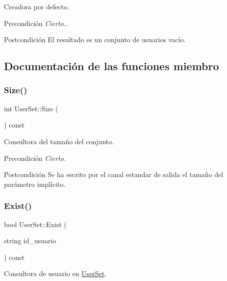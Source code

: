 Creadora por defecto. 

\begin{DoxyPrecond}{Precondición}
{\itshape Cierto.}. 
\end{DoxyPrecond}
\begin{DoxyPostcond}{Postcondición}
El resultado es un conjunto de usuarios vacío. 
\end{DoxyPostcond}


\subsection{Documentación de las funciones miembro}
\mbox{\label{class_user_set_a2474615357041661d6c00ce66209e747}} 
\subsubsection{\texorpdfstring{Size()}{Size()}}
{\footnotesize\ttfamily int User\+Set\+::\+Size (\begin{DoxyParamCaption}{ }\end{DoxyParamCaption}) const}



Consultora del tamaño del conjunto. 

\begin{DoxyPrecond}{Precondición}
{\itshape Cierto.} 
\end{DoxyPrecond}
\begin{DoxyPostcond}{Postcondición}
Se ha escrito por el canal estandar de salida el tamaño del parámetro implícito. 
\end{DoxyPostcond}
\mbox{\label{class_user_set_a71ead20f591befdba9f6a1e524fa3271}} 
\subsubsection{\texorpdfstring{Exist()}{Exist()}}
{\footnotesize\ttfamily bool User\+Set\+::\+Exist (\begin{DoxyParamCaption}\item[{string}]{id\+\_\+usuario }\end{DoxyParamCaption}) const}



Consultora de usuario en \mbox{\hyperlink{class_user_set}{User\+Set}}. 

